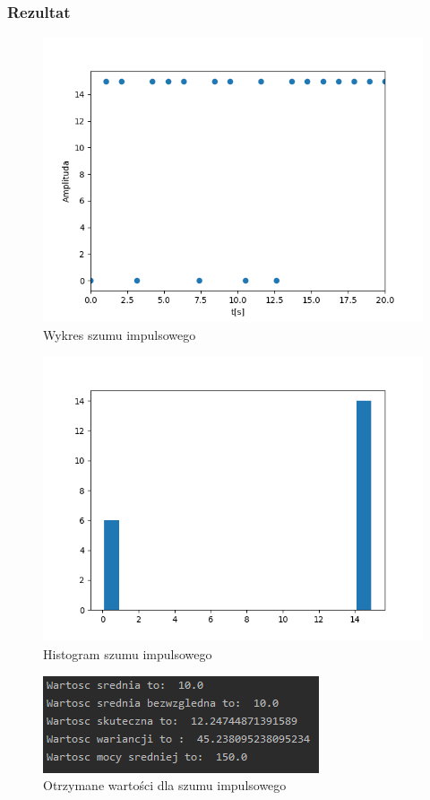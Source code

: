 \documentclass[12pt]{article}
\begin{document}
\subsubsection{Rezultat}
\begin{figure}[H]
\centering
\includegraphics[scale=0.8]{szumImpulsWykres.png}
\caption{Wykres szumu impulsowego}
\end{figure}
\begin{figure}[H]
\centering
\includegraphics[scale=0.8]{szumImpulsHist.png}
\caption{Histogram szumu impulsowego}
\end{figure}
\begin{figure}[H]
\centering
\includegraphics[scale=0.8]{szumImpulsParam.png}
\caption{Otrzymane wartości dla szumu impulsowego}
\end{figure}
\end{document}
